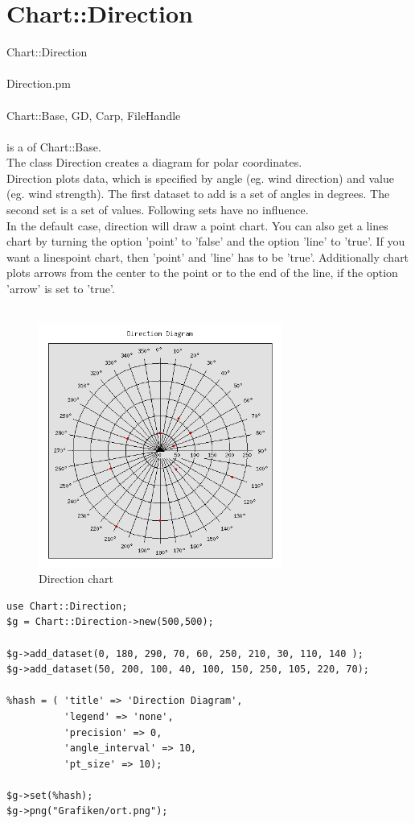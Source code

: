 \section{Chart::Direction}
 Chart::Direction\\ \\
 Direction.pm\\ \\
Chart::Base, GD, Carp, FileHandle\\ \\
  is a  of Chart::Base.\\
The class Direction creates a diagram for polar coordinates.\\
Direction plots data, which is specified by angle (eg. wind direction) and value (eg. wind strength). The first dataset to add is a set of angles in degrees. The second set is a set of values. Following sets have no influence.\\ 
In the default case, direction will draw a point chart. You can also get a lines chart by turning the option 'point' to 'false' and the option 'line' to 'true'. If you want a linespoint chart, then 'point' and 'line' has to be 'true'. Additionally chart plots arrows from the center to the point or to the end of the line, if the option 'arrow' is set to 'true'.\\
\\
\begin{figure}[h]
	\begin{center}
		\includegraphics[width = 8cm, height =8cm]{ort.png}
	\end{center}
	\caption{Direction chart}
	\label{fig:direction}
\end{figure}
\begin{verbatim}
use Chart::Direction;
$g = Chart::Direction->new(500,500);

$g->add_dataset(0, 180, 290, 70, 60, 250, 210, 30, 110, 140 );
$g->add_dataset(50, 200, 100, 40, 100, 150, 250, 105, 220, 70);

%hash = ( 'title' => 'Direction Diagram',
          'legend' => 'none',
          'precision' => 0,
          'angle_interval' => 10,
          'pt_size' => 10);
      
$g->set(%hash);
$g->png("Grafiken/ort.png");
\end{verbatim}
